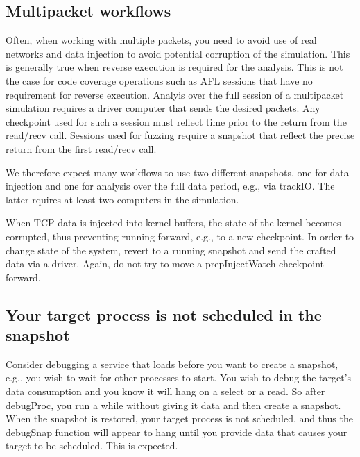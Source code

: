 \documentclass[titlepage]{article}
\begin{document}
\begin{appendices}
\subsection{Multipacket workflows}
Often, when working with multiple packets, you need to avoid use of real networks and data injection to avoid potential corruption of the simulation.
This is generally true when reverse execution is required for the analysis.  This is not the case for code coverage operations such as AFL sessions that
have no requirement for reverse execution.  Analyis over the full session of a multipacket simulation requires a driver computer that sends the desired
packets.  Any checkpoint used for such a session must reflect time prior to the return from the read/recv call.  Sessions used for fuzzing 
require a snapshot that reflect the precise return from the first read/recv call.  

We therefore expect many workflows to use two different snapshots, one for data injection and one for analysis over the full data period, e.g., via trackIO.
The latter rquires at least two computers in the simulation.  

When TCP data is injected into kernel buffers, the state of the kernel becomes corrupted, thus preventing running forward, e.g., to a new checkpoint.
In order to change state of the system, revert to a running snapshot and send the crafted data via a driver.  Again, do not try to move a prepInjectWatch
checkpoint forward.

\subsection{Your target process is not scheduled in the snapshot}
Consider debugging a service that loads before you want to create a snapshot, e.g., you wish to wait for other processes to start.
You wish to debug the target's data consumption and you know it will hang on a select or a read. So after debugProc, 
you run a while without giving it data and then create a snapshot.  When the snapshot
is restored, your target process is not scheduled, and thus the debugSnap function will appear to hang until you provide data that causes your
target to be scheduled.  This is expected.


\end{appendices}
\end{document}
